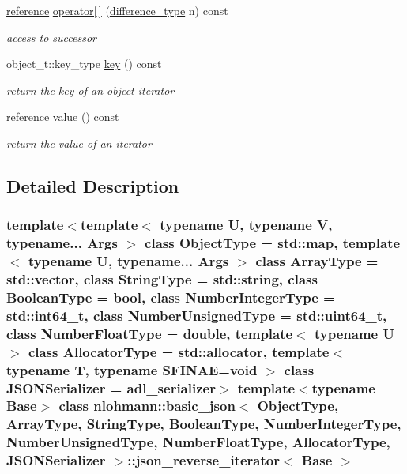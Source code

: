 \begin{DoxyCompactItemize}
\hyperlink{classnlohmann_1_1basic__json_1_1json__reverse__iterator_ab0021ef2007fd338615360af404dcd4e}{reference} \hyperlink{classnlohmann_1_1basic__json_1_1json__reverse__iterator_af4879af64a0f24bd308b13b859808f84}{operator\mbox{[}$\,$\mbox{]}} (\hyperlink{classnlohmann_1_1basic__json_afe7c1303357e19cea9527af4e9a31d8f}{difference\+\_\+type} n) const
\begin{DoxyCompactList}\small\item\em access to successor \end{DoxyCompactList}\item 
object\+\_\+t\+::key\+\_\+type \hyperlink{classnlohmann_1_1basic__json_1_1json__reverse__iterator_a26c551e1cee90ee52be00b5165804598}{key} () const
\begin{DoxyCompactList}\small\item\em return the key of an object iterator \end{DoxyCompactList}\item 
\hyperlink{classnlohmann_1_1basic__json_1_1json__reverse__iterator_ab0021ef2007fd338615360af404dcd4e}{reference} \hyperlink{classnlohmann_1_1basic__json_1_1json__reverse__iterator_af51506d91ecf911c97521e10a047c841}{value} () const
\begin{DoxyCompactList}\small\item\em return the value of an iterator \end{DoxyCompactList}\end{DoxyCompactItemize}


\subsection{Detailed Description}
\subsubsection*{template$<$template$<$ typename U, typename V, typename... Args $>$ class Object\+Type = std\+::map, template$<$ typename U, typename... Args $>$ class Array\+Type = std\+::vector, class String\+Type = std\+::string, class Boolean\+Type = bool, class Number\+Integer\+Type = std\+::int64\+\_\+t, class Number\+Unsigned\+Type = std\+::uint64\+\_\+t, class Number\+Float\+Type = double, template$<$ typename U $>$ class Allocator\+Type = std\+::allocator, template$<$ typename T, typename S\+F\+I\+N\+A\+E=void $>$ class J\+S\+O\+N\+Serializer = adl\+\_\+serializer$>$\newline
template$<$typename Base$>$\newline
class nlohmann\+::basic\+\_\+json$<$ Object\+Type, Array\+Type, String\+Type, Boolean\+Type, Number\+Integer\+Type, Number\+Unsigned\+Type, Number\+Float\+Type, Allocator\+Type, J\+S\+O\+N\+Serializer $>$\+::json\+\_\+reverse\+\_\+iterator$<$ Base $>$}

